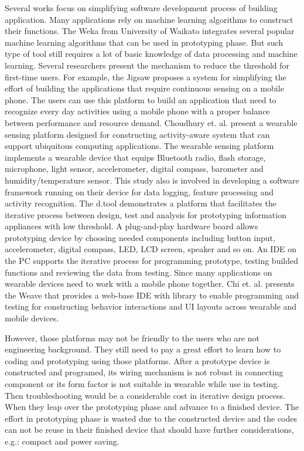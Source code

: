 Several works focus on simplifying software development process of building application.
Many applications rely on machine learning algorithms to construct their functions.
The Weka \cite{Weka} from University of Waikato integrates several popular machine learning algorithms that can be used in prototyping phase. 
But such type of tool still requires a lot of basic knowledge of data processing and machine learning. Several researchers present the mechanism to reduce the threshold for first-time users. For example, the Jigsaw \cite{Jigsaw2010} proposes a system for simplifying the effort of building the applications that require continuous sensing on a mobile phone. The users can use this platform to build an application that need to recognize every day activities using a mobile phone with a proper balance between performance and resource demand.
Choudhury et. al. \cite{Mobile_Sensing_Platform} present a wearable sensing platform designed for constructing activity-aware system that can support ubiquitous computing applications. The wearable sensing platform implements a wearable device that equips Bluetooth radio, flash storage, microphone, light sensor, accelerometer, digital compass, barometer and humidity/temperature sensor. This study also is involved in developing a software framework running on their device for data logging, feature processing and activity recognition.
The d.tool \cite{dtool} demonstrates a platform that facilitates the iterative process between design, test and analysis for prototyping information appliances with low threshold. A plug-and-play hardware board allows prototyping device by choosing needed components including button input, accelerometer, digital compass, LED, LCD screen, speaker and so on. An IDE on the PC supports the iterative process for programming prototype, testing builded functions and reviewing the data from testing.
Since many applications on wearable devices need to work with a mobile phone together. Chi et. al. presents the Weave \cite{Weave2015} that provides a web-base IDE with library to enable programming and testing for constructing behavior interactions and UI layouts across wearable and mobile devices. 

However, those platforms may not be friendly to the users who are not engineering background. They still need to pay a great effort to learn how to coding and prototyping using those platforms. After a prototype device is constructed and programed, its wiring mechanism is not robust in connecting component or its form factor is not suitable in wearable while use in testing. Then troubleshooting would be a considerable cost in iterative design process. When they leap over the prototyping phase and advance to a finished device. The effort in prototyping phase is wasted due to the constructed device and the codes can not be reuse in their finished device that should have further considerations, e.g.: compact and power saving. 

